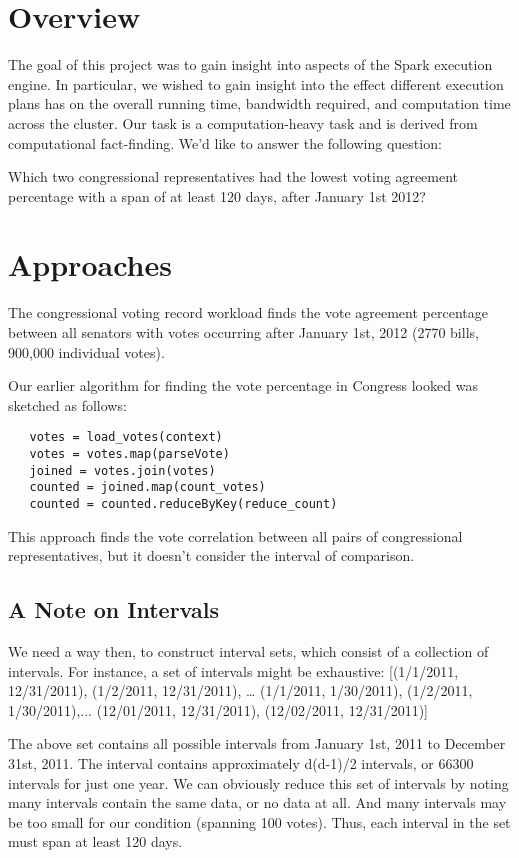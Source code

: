 \documentclass[11pt]{article}
\begin{document}
\maketitle
\section{Overview}
The goal of this project was to gain insight into aspects of the Spark execution engine. In particular, we wished to gain insight into the effect different execution plans has on the overall running time, bandwidth required, and computation time across the cluster. Our task is a computation-heavy task and is derived from computational fact-finding. We'd like to answer the following question:

Which two congressional representatives had the lowest voting agreement percentage with a span of at least 120 days, after January 1st 2012?

\section{Approaches}
The congressional voting record workload finds the vote agreement percentage between all senators with votes occurring after January 1st, 2012 (2770 bills, 900,000 individual votes). 

Our earlier algorithm for finding the vote percentage in Congress looked was sketched as follows: 

\begin{lstlisting}
   votes = load_votes(context)
   votes = votes.map(parseVote)
   joined = votes.join(votes)
   counted = joined.map(count_votes)
   counted = counted.reduceByKey(reduce_count)
\end{lstlisting}

This approach finds the vote correlation between all pairs of congressional representatives, but it doesn’t consider the interval of comparison. 

\subsection{A Note on Intervals}
We need a way then, to construct interval sets, which consist of a collection of intervals. For instance, a set of intervals might be exhaustive:
[(1/1/2011, 12/31/2011), (1/2/2011, 12/31/2011), …
(1/1/2011, 1/30/2011), (1/2/2011, 1/30/2011),...
(12/01/2011, 12/31/2011), (12/02/2011, 12/31/2011)]

The above set contains all possible intervals from January 1st, 2011 to December 31st, 2011. The interval contains approximately d(d-1)/2 intervals, or 66300 intervals for just one year. We can obviously reduce this set of intervals by noting many intervals contain the same data, or no data at all. And many intervals may be too small for our condition (spanning 100 votes). Thus, each interval in the set must span at least 120 days.
\end{document}

